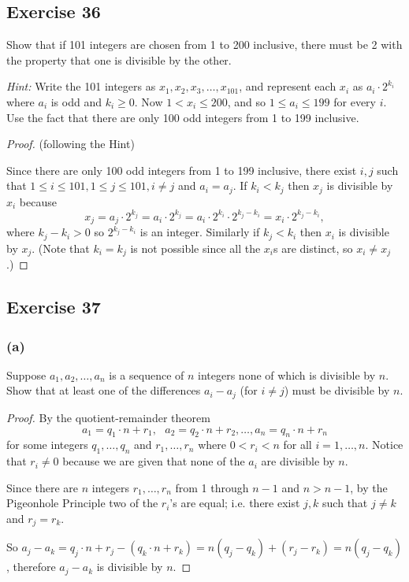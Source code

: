 \documentclass[14pt]{extarticle}
\begin{document}
\subsection{Exercise 36}
Show that if 101 integers are chosen from 1 to 200 inclusive, there must be 2 with the property that one is 
divisible by the other.

{\it Hint:} Write the 101 integers as \(x_1, x_2, x_3, \ldots, x_{101}\), and represent each \(x_i\) as 
\(a_i \cdot 2^{k_i}\) where \(a_i\) is odd and \(k_i \geq 0\). Now \(1 < x_i \leq 200\), and so \(1 \leq a_i \leq 
199\) for every \(i\). Use the fact that there are only 100 odd integers from 1 to 199 inclusive.

\begin{proof}
(following the Hint)

Since there are only 100 odd integers from 1 to 199 inclusive, there exist \(i, j\) such that \(1 \leq i \leq 
101, 1 \leq j \leq 101, i \neq j\) and \(a_i = a_j\). If \(k_i < k_j\) then \(x_j\) is divisible by \(x_i\) because 
\[
x_j = a_j \cdot 2^{k_j} = a_i \cdot 2^{k_j} = a_i \cdot 2^{k_i} \cdot 2^{k_j-k_i} = x_i \cdot 2^{k_j-k_i},
\]
where \(k_j - k_i > 0\) so \(2^{k_j-k_i}\) is an integer. Similarly if \(k_j < k_i\) then \(x_i\) is divisible by
\(x_j\). (Note that \(k_i = k_j\) is not possible since all the \(x_i\)s are distinct, so \(x_i \neq x_j\).)
\end{proof}

\subsection{Exercise 37}
\subsubsection{(a)}
Suppose \(a_1, a_2, \ldots, a_n\) is a sequence of \(n\) integers none of which is divisible by \(n\). Show that at 
least one of the differences \(a_i - a_j\) (for \(i \neq j\)) must be divisible by \(n\).

\begin{proof}
By the quotient-remainder theorem 
\[
a_1 = q_1 \cdot n + r_1, \,\,\,\, a_2 = q_2 \cdot n + r_2,  \ldots, a_n = q_n \cdot n + r_n 
\]
for some integers \(q_1, \ldots, q_n\) and \(r_1, \ldots, r_n\) where \(0 < r_i < n\) for all \(i = 1,\ldots,n\).
Notice that \(r_i \neq 0\) because we are given that none of the \(a_i\) are divisible by \(n\).

Since there are \(n\) integers \(r_1, \ldots, r_n\) from 1 through \(n-1\) and \(n > n-1\), by the Pigeonhole 
Principle two of the \(r_i\)'s are equal; i.e. there exist \(j, k\) such that \(j \neq k\) and \(r_j = r_k\).

So \(a_j - a_k = q_j \cdot n + r_j - (q_k \cdot n + r_k) = n(q_j - q_k) + (r_j - r_k) = n(q_j-q_k)\), therefore
\(a_j-a_k\) is divisible by \(n\).
\end{proof}
\end{document}
